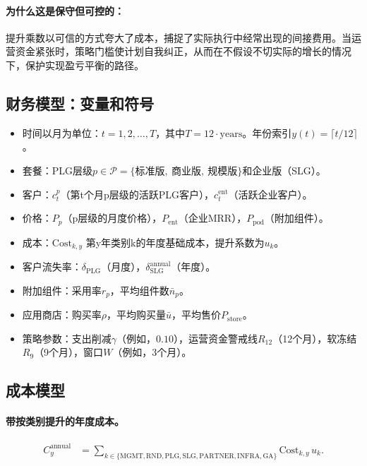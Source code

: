 \documentclass[11pt, a4paper, oneside]{article}
\begin{document}
\paragraph{为什么这是保守但可控的：}
提升乘数以可信的方式夸大了成本，捕捉了实际执行中经常出现的间接费用。当运营资金紧张时，策略门槛使计划自我纠正，从而在不假设不切实际的增长的情况下，保护实现盈亏平衡的路径。

\subsection{财务模型：变量和符号}
\begin{itemize}
  \item 时间以月为单位：$t = 1,2,\dots,T$，其中$T = 12 \cdot \text{years}$。年份索引$y(t) = \lceil t/12 \rceil$。
  \item 套餐：PLG层级$p \in \mathcal{P}=\{\text{标准版},\ \text{商业版},\ \text{规模版}\}$和企业版（SLG）。
  \item 客户：$c^p_t$（第t个月p层级的活跃PLG客户），$c^{\mathrm{ent}}_t$（活跃企业客户）。
  \item 价格：$P_p$（p层级的月度价格），$P_{\mathrm{ent}}$（企业MRR），$P_{\mathrm{pod}}$（附加组件）。
  \item 成本：$\mathrm{Cost}_{k,y}$ 第y年类别k的年度基础成本，提升系数为$u_k$。
  \item 客户流失率：$\delta_{\mathrm{PLG}}$（月度），$\delta^{\mathrm{annual}}_{\mathrm{SLG}}$（年度）。
  \item 附加组件：采用率$r_p$，平均组件数$\bar{n}_p$。
  \item 应用商店：购买率$\rho$，平均购买量$\bar{u}$，平均售价$P_{\mathrm{store}}$。
  \item 策略参数：支出削减$\gamma$（例如，$0.10$），运营资金警戒线$R_{12}$（12个月），软冻结$R_{9}$（9个月），窗口$W$（例如，$3$个月）。
\end{itemize}

\newpage
\subsection{成本模型}
\paragraph{带按类别提升的年度成本。}
\begin{align}
C^{\mathrm{annual}}_y 
  &= \sum_{k \in \{\mathrm{MGMT},\mathrm{RND},\mathrm{PLG},\mathrm{SLG},\mathrm{PARTNER},\mathrm{INFRA},\mathrm{GA}\}}
     \mathrm{Cost}_{k,y}\, u_k.
\end{align}
\end{document}
